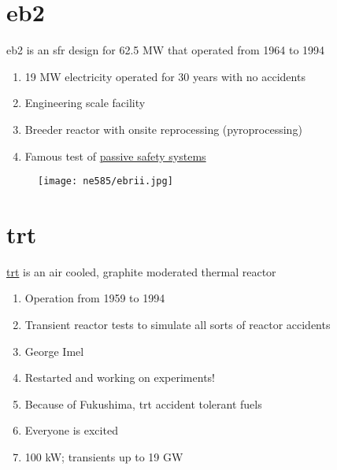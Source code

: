 \documentclass[aspectratio=1610,pdftex,dvipsnames,compress,xcolor={dvipsnames}]{beamer}
\newcommand{\acf}{\acrfull} %
\newcommand{\acs}{\acrshort} %
\begin{document}
\section{\acs{eb2}}


\addtocounter{framenumber}{-1} 
\begin{frame}{\acs{eb2} is an \acf{sfr} design for 62.5 MW that operated from 1964 to 1994}
    \begin{enumerate}[series=outerlist,topsep=0pt,itemsep=21pt,leftmargin=*,label=(\arabic*)]
        \item[]19 MW electricity operated for 30 years with no accidents
        \item[]Engineering scale facility
        \item[]Breeder reactor with onsite reprocessing (pyroprocessing)
        \item[]Famous test of \href{https://youtu.be/Sp1Xja6HlIU}{passive safety systems}
    \end{enumerate}
\end{frame}


\begin{frame}{}
    \begin{figure}
        \centering
        \texttt{[image: ne585/ebrii.jpg]}
    \end{figure}
\end{frame}


\section{\acs{trt}}


\addtocounter{framenumber}{-1} 
\begin{frame}{\href{https://uidaho.pressbooks.pub/nuclearengineering/chapter/front-end-of-the-fuel-cycle/}{\acs{trt}} is an air cooled, graphite moderated thermal reactor}
    \begin{enumerate}[series=outerlist,topsep=0pt,itemsep=21pt,leftmargin=*,label=(\arabic*)]
        \item[]Operation from 1959 to 1994
        \item[]Transient reactor tests to simulate all sorts of reactor accidents
        \item[]George Imel
        \item[]Restarted and working on experiments!
        \item[]Because of Fukushima, \acs{trt} accident tolerant fuels
        \item[]Everyone is excited
        \item[]100 kW; transients up to 19 GW
    \end{enumerate}
\end{frame}
\end{document}
